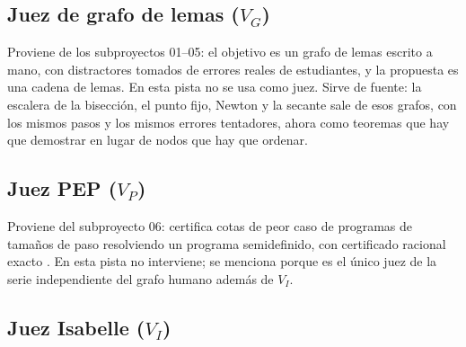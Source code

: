 \documentclass[11pt,a4paper]{article}
\begin{document}
\subsection{Juez de grafo de lemas ($V_G$)}

Proviene de los subproyectos 01--05: el objetivo es un grafo de lemas escrito a mano, con distractores tomados de errores reales de estudiantes, y la propuesta es una cadena de lemas. En esta pista no se usa como juez. Sirve de fuente: la escalera de la bisección, el punto fijo, Newton y la secante sale de esos grafos, con los mismos pasos y los mismos errores tentadores, ahora como teoremas que hay que demostrar en lugar de nodos que hay que ordenar.

\subsection{Juez PEP ($V_P$)}

Proviene del subproyecto 06: certifica cotas de peor caso de programas de tamaños de paso resolviendo un programa semidefinido, con certificado racional exacto \citep{DroriTeboulle2014,TaylorHendrickxGlineur2017}. En esta pista no interviene; se menciona porque es el único juez de la serie independiente del grafo humano además de $V_I$.

\subsection{Juez Isabelle ($V_I$)}
\end{document}
